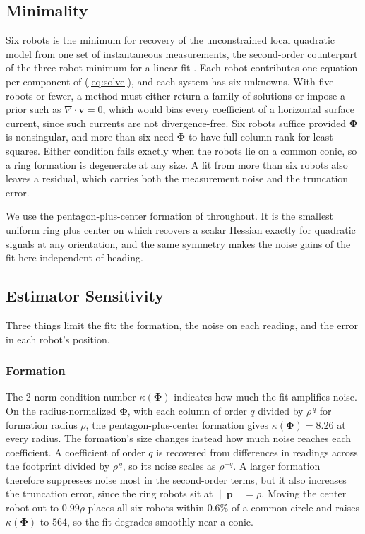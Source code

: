 \documentclass[lettersize,journal]{IEEEtran}
\begin{document}
\subsection{Minimality}
\label{sec:minimality}

Six robots is the minimum for recovery of the unconstrained local
quadratic model from one set of instantaneous measurements, the
second-order counterpart of the three-robot minimum for a linear fit
\cite[Prop.~1]{10}. Each robot contributes one equation per component of
(\ref{eq:solve}), and each system has six unknowns. With five robots or
fewer, a method must either return a family of solutions or impose a
prior such as $\nabla\cdot\mathbf{v} = 0$, which would bias every
coefficient of a horizontal surface current, since such currents are not
divergence-free. Six robots suffice provided $\boldsymbol{\Phi}$ is
nonsingular, and more than six need $\boldsymbol{\Phi}$ to have full
column rank for least squares. Either condition fails exactly when the
robots lie on a common conic, so a ring formation is degenerate at any
size. A fit from more than six robots also leaves a residual, which
carries both the measurement noise and the truncation error.

We use the pentagon-plus-center formation of \cite{5} throughout. It is
the smallest uniform ring plus center on which \cite{5} recovers a scalar
Hessian exactly for quadratic signals at any orientation, and the same
symmetry makes the noise gains of the fit here independent of heading.


\subsection{Estimator Sensitivity}
\label{sec:sensitivity}

Three things limit the fit: the formation, the noise on each reading,
and the error in each robot's position.

\subsubsection{Formation}
The 2-norm condition number $\kappa(\boldsymbol{\Phi})$ indicates how much
the fit amplifies noise. On the radius-normalized $\boldsymbol{\Phi}$, with
each column of order $q$ divided by $\rho^{\,q}$ for formation radius
$\rho$, the pentagon-plus-center formation gives
$\kappa(\boldsymbol{\Phi}) = 8.26$ at every radius. The formation's size
changes instead how much noise reaches each coefficient. A coefficient of order $q$ is recovered
from differences in readings across the footprint divided by
$\rho^{\,q}$, so its noise scales as $\rho^{-q}$. A larger formation
therefore suppresses noise most in the second-order terms, but it also
increases the truncation error, since the ring robots sit at
$\|\mathbf{p}\| = \rho$. Moving the center robot out to $0.99\rho$
places all six robots within $0.6\%$ of a common circle and raises
$\kappa(\boldsymbol{\Phi})$ to $564$, so the fit degrades smoothly near
a conic.
\end{document}
